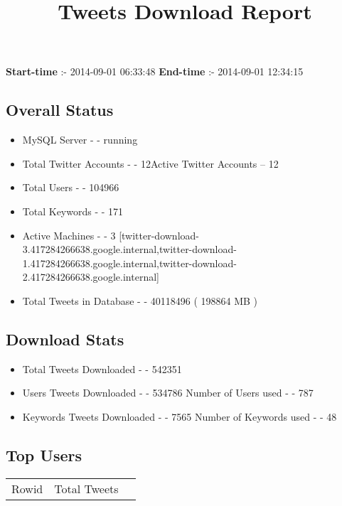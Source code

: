 \documentclass{article}\usepackage[T1]{fontenc}
\begin{document}
\title{\textbf{Tweets Download Report}}
               \date{}
                \maketitle
               \centerline{\textbf{Start-time} :- 2014-09-01 06:33:48 \hspace{40pt} \textbf{End-time} :- 2014-09-01 12:34:15}               \subsection*{Overall Status}                \begin{itemize}                \item MySQL Server - - running               \item Total Twitter Accounts - - 12\newline Active Twitter Accounts -- 12               \item Total Users - - 104966               \item Total Keywords - - 171               \item Active Machines - - 3 [twitter-download-3.417284266638.google.internal,twitter-download-1.417284266638.google.internal,twitter-download-2.417284266638.google.internal]               \item Total Tweets in Database - - 40118496 ( 198864 MB )               \end{itemize}               \subsection*{Download Stats}                \begin{itemize}                \item Total Tweets Downloaded - - 542351               \item Users Tweets Downloaded - - 534786 \newline Number of Users used - - 787               \item Keywords Tweets Downloaded - - 7565 \newline Number of Keywords used - - 48              \end{itemize}              \subsection*{Top Users}\begin{tabular}{|c|c|c|}         \hline         Rowid & Total Tweets \\ 

\end{tabular}
\end{document}
